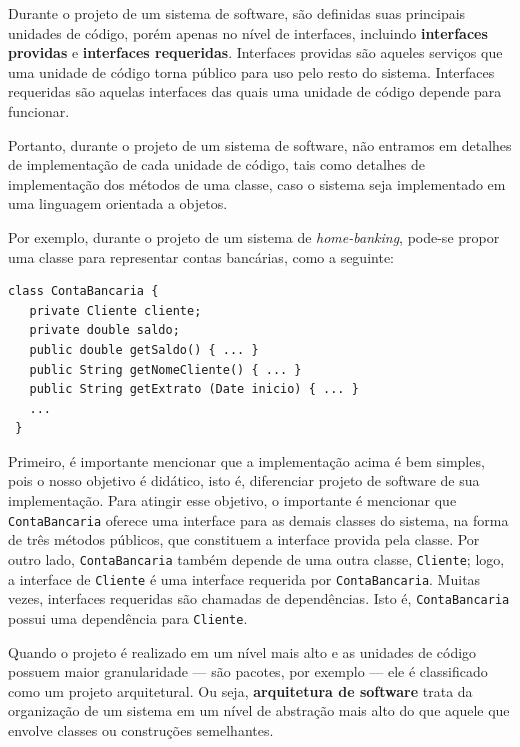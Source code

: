 \documentclass[
  11pt,
  twoside]{book}
\newcommand{\passthrough}[1]{#1}
\begin{document}
 Durante o projeto de um sistema de software,
são definidas suas principais unidades de código, porém apenas no nível
de interfaces, incluindo \textbf{interfaces providas} e
\textbf{interfaces requeridas}. Interfaces providas são aqueles serviços
que uma unidade de código torna público para uso pelo resto do sistema.
Interfaces requeridas são aquelas interfaces das quais uma unidade de
código depende para funcionar.

Portanto, durante o projeto de um sistema de software, não entramos em
detalhes de implementação de cada unidade de código, tais como detalhes
de implementação dos métodos de uma classe, caso o sistema seja
implementado em uma linguagem orientada a objetos.

Por exemplo, durante o projeto de um sistema de \emph{home-banking},
pode-se propor uma classe para representar contas bancárias, como a
seguinte:

\begin{lstlisting}
class ContaBancaria {                                                                          
   private Cliente cliente;                        
   private double saldo;                           
   public double getSaldo() { ... }               
   public String getNomeCliente() { ... }         
   public String getExtrato (Date inicio) { ... } 
   ...                                            
 }                                               
\end{lstlisting}

Primeiro, é importante mencionar que a implementação acima é bem
simples, pois o nosso objetivo é didático, isto é, diferenciar projeto
de software de sua implementação. Para atingir esse objetivo, o
importante é mencionar que \passthrough{\lstinline!ContaBancaria!}
oferece uma interface para as demais classes do sistema, na forma de
três métodos públicos, que constituem a interface provida pela classe.
Por outro lado, \passthrough{\lstinline!ContaBancaria!} também depende
de uma outra classe, \passthrough{\lstinline!Cliente!}; logo, a
interface de \passthrough{\lstinline!Cliente!} é uma interface requerida
por \passthrough{\lstinline!ContaBancaria!}. Muitas vezes, interfaces
requeridas são chamadas de dependências. Isto é,
\passthrough{\lstinline!ContaBancaria!} possui uma dependência para
\passthrough{\lstinline!Cliente!}.

 Quando o projeto é realizado em um nível
mais alto e as unidades de código possuem maior granularidade --- são
pacotes, por exemplo --- ele é classificado como um projeto
arquitetural. Ou seja, \textbf{arquitetura de software} trata da
organização de um sistema em um nível de abstração mais alto do que
aquele que envolve classes ou construções semelhantes.
\end{document}
